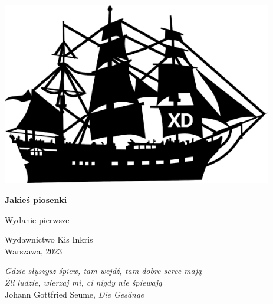 \documentclass[11pt, twoside]{book}
\begin{document}
\begin{titlepage}
    \begin{center}
        \vspace*{5cm}
        
        \includegraphics[height=8cm]{images/front-obrazek.png}

        \vspace{1.5cm}

        \Huge\textbf{Jakieś piosenki}
        
        \vspace{0.5cm}
        
        \large Wydanie pierwsze
        
        \vfill

        \large
        Wydawnictwo Kis Inkris \\
        Warszawa, 2023

        \vspace{0.8cm}

        \footnotesize
        \textit{%
        Gdzie słyszysz śpiew, tam wejdź, tam dobre serce mają \\
        Żli ludzie, wierzaj mi, ci nigdy nie śpiewają} \medskip \\
        Johann Gottfried Seume, \textit{Die Gesänge}

    \end{center}
\end{titlepage}

\pagestyle{plain}
\end{document}
